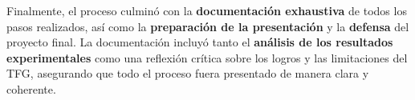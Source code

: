 Finalmente, el proceso culminó con la \textbf{documentación exhaustiva} de todos los pasos realizados, así como la
\textbf{preparación de la presentación} y la \textbf{defensa} del proyecto final.
La documentación incluyó tanto el \textbf{análisis de los resultados experimentales} como una reflexión crítica sobre
los logros y las limitaciones del TFG, asegurando que todo el proceso fuera presentado de manera clara y coherente.
\\[6pt]





